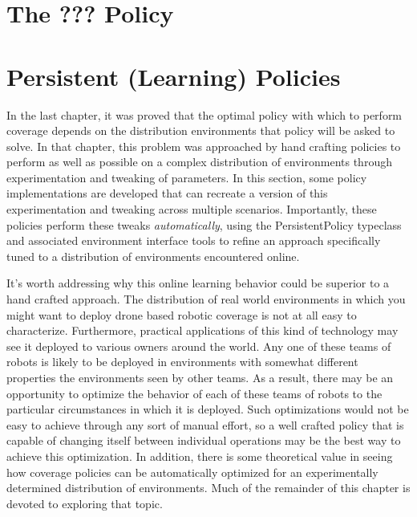 \section{The ??? Policy}


\section{Persistent (Learning) Policies}

In the last chapter, it was proved that the optimal policy with which to perform coverage depends on the distribution environments that policy will be asked to solve. In that chapter, this problem was approached by hand crafting policies to perform as well as possible on a complex distribution of environments through experimentation and tweaking of parameters. In this section, some policy implementations are developed that can recreate a version of this experimentation and tweaking across multiple scenarios. Importantly, these policies perform these tweaks \textit{automatically}, using the PersistentPolicy typeclass and associated environment interface tools to refine an approach specifically tuned to a distribution of environments encountered online.

It's worth addressing why this online learning behavior could be superior to a hand crafted approach. The distribution of real world environments in which you might want to deploy drone based robotic coverage is not at all easy to characterize. Furthermore, practical applications of this kind of  technology may see it deployed to various owners around the world. Any one of these teams of robots is likely to be deployed in environments with somewhat different properties the environments seen by other teams. As a result, there may be an opportunity to optimize the behavior of each of these teams of robots to the particular circumstances in which it is deployed. Such optimizations would not be easy to achieve through any sort of manual effort, so a well crafted policy that is capable of changing itself between individual operations may be the best way to achieve this optimization. In addition, there is some theoretical value in seeing how coverage policies can be automatically optimized for an experimentally determined distribution of environments. Much of the remainder of this chapter is devoted to exploring that topic.

